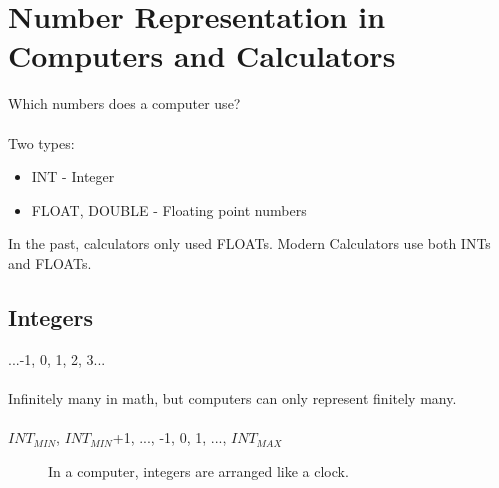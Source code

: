 \documentclass[a4paper,12pt,]{report}
\begin{document}
\chapter{Number Representation in Computers and Calculators}

	Which numbers does a computer use?\\
\\
	Two types:

\begin{itemize}
	\item{INT - Integer}
	\item{FLOAT, DOUBLE - Floating point numbers}\\
\end{itemize}

	In the past, calculators only used FLOATs. Modern Calculators use both INTs and FLOATs.


\section{Integers}
	...-1, 0, 1, 2, 3...\\ \\

	Infinitely many in math, but computers can only represent finitely many.\\ \\
	$INT_{MIN}$, $INT_{MIN}$+1, ..., -1, 0, 1, ..., $INT_{MAX}$


\begin{figure}[!htb]

	\caption{In a computer, integers are arranged like a clock.}\label{fig:INT Rollover}
\end{figure}
\end{document}
